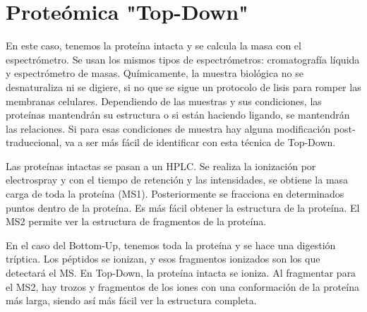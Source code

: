 
\section{Proteómica "Top-Down"}
En este caso, tenemos la proteína intacta y se calcula la masa con el espectrómetro. Se usan los mismos tipos de espectrómetros: cromatografía líquida y espectrómetro de masas. Químicamente, la muestra biológica no se desnaturaliza ni se digiere, si no que se sigue un protocolo de lisis para romper las membranas celulares. Dependiendo de las muestras y sus condiciones, las proteínas mantendrán su estructura o si están haciendo ligando, se mantendrán las relaciones. Si para esas condiciones de muestra hay alguna modificación post-traduccional, va a ser más fácil de identificar con esta técnica de Top-Down. 

Las proteínas intactas se pasan a un HPLC. Se realiza la ionización por electrospray y con el tiempo de retención y las intensidades, se obtiene la masa carga de toda la proteína (MS1). Posteriormente se fracciona en determinados puntos dentro de la proteína. Es más fácil obtener la estructura de la proteína. El MS2 permite ver la estructura de fragmentos de la proteína. 

En el caso del Bottom-Up, tenemos toda la proteína y se hace una digestión tríptica. Los péptidos se ionizan, y esos fragmentos ionizados son los que detectará el MS. En Top-Down, la proteína intacta se ioniza. Al fragmentar para el MS2, hay trozos y fragmentos de los iones con una conformación de la proteína más larga, siendo así más fácil ver la estructura completa. 

